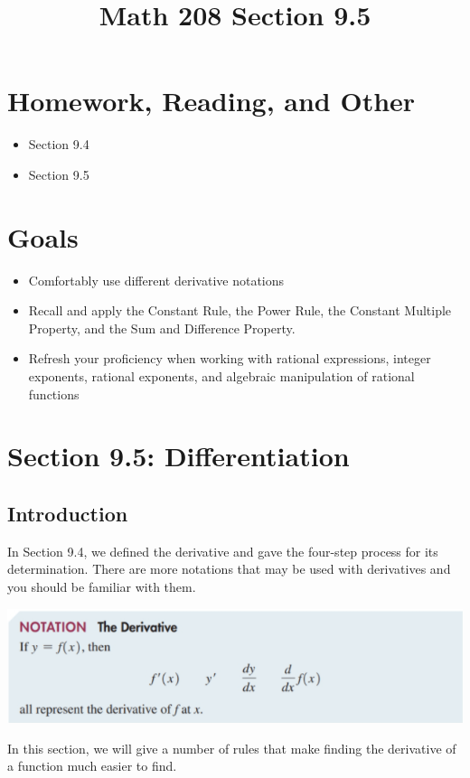 \documentclass[14pt]{extarticle}
\title{\vspace{-5ex}Math 208 Section 9.5}
\date{\vspace{-10ex}}
\begin{document}
	\maketitle		
	\section*{Homework, Reading, and Other}
	\begin{itemize}
		\item Section 9.4
		\item Section 9.5
	\end{itemize}

	\section{Goals}
	\begin{itemize}
		\item Comfortably use different derivative notations
		\item Recall and apply the Constant Rule, the Power Rule, the Constant Multiple Property, and the Sum and Difference Property.
		\item Refresh your proficiency when working with rational expressions, integer exponents, rational exponents, and algebraic manipulation of rational functions
	\end{itemize}
		

\section{Section 9.5: Differentiation}
\subsection{Introduction}
In Section 9.4, we defined the derivative and gave the four-step process for its determination. There are more notations that may be used with derivatives and you should be familiar with them.
\begin{center}
	\includegraphics[width=0.9\linewidth]{9-5-1}
\end{center}
In this section, we will give a number of rules that make finding the derivative of a function much easier to find.
\end{document}
